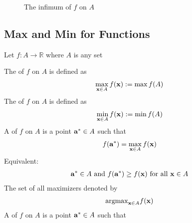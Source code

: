 \documentclass[letterpaper,10pt,english]{jupyterBook}
\begin{document}
\begin{figure}[htbp]
\centering
\capstart

\noindent{}
\caption{The infimum of \(f\) on \(A\)}\label{\detokenize{06.optimization_fundamentals:id6}}\end{figure}


\subsection{Max and Min for Functions}
\label{\detokenize{06.optimization_fundamentals:max-and-min-for-functions}}
\sphinxAtStartPar
Let \(f \colon A \to \mathbb{R}\) where \(A\) is any set

\sphinxAtStartPar
The  of \(f\) on \(A\) is defined as
\begin{equation*}
\begin{split}
%
\max_{{\bf x} \in A} f({\bf x}) 
:= \max f(A)
%
\end{split}
\end{equation*}
\sphinxAtStartPar
The  of \(f\) on \(A\) is defined as
\begin{equation*}
\begin{split}
%
\min_{{\bf x} \in A} f({\bf x}) 
:= \min f(A)
%
\end{split}
\end{equation*}
\sphinxAtStartPar
A  of \(f\) on \(A\) is a point \({\bf a}^* \in A\) such that
\begin{equation*}
\begin{split}
%
f({\bf a}^*) = \max_{{\bf x} \in A} f({\bf x})
%
\end{split}
\end{equation*}
\sphinxAtStartPar
Equivalent:
\begin{equation*}
\begin{split}
%
{\bf a}^* \in A \text{ and } f({\bf a}^*) \geq f({\bf x}) \text{ for all
} {\bf x} \in A
%
\end{split}
\end{equation*}
\sphinxAtStartPar
The set of all maximizers denoted by
\begin{equation*}
\begin{split}\mathrm{argmax}_{{\bf x} \in A}f({\bf x})\end{split}
\end{equation*}
\sphinxAtStartPar
A  of \(f\) on \(A\) is a point \({\bf a}^* \in A\) such that
\end{document}
